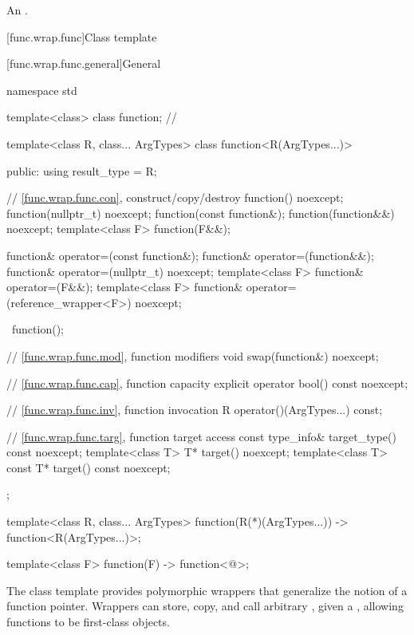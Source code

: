 \begin{itemdescr}
\pnum
\returns
An
 \ntbs{}.
\end{itemdescr}

[func.wrap.func]{Class template }

[func.wrap.func.general]{General}
%

%
\begin{codeblock}
namespace std {
  template<class> class function;       // \notdef

  template<class R, class... ArgTypes>
  class function<R(ArgTypes...)> {
  public:
    using result_type = R;

    // \ref{func.wrap.func.con}, construct/copy/destroy
    function() noexcept;
    function(nullptr_t) noexcept;
    function(const function&);
    function(function&&) noexcept;
    template<class F> function(F&&);

    function& operator=(const function&);
    function& operator=(function&&);
    function& operator=(nullptr_t) noexcept;
    template<class F> function& operator=(F&&);
    template<class F> function& operator=(reference_wrapper<F>) noexcept;

    ~function();

    // \ref{func.wrap.func.mod}, function modifiers
    void swap(function&) noexcept;

    // \ref{func.wrap.func.cap}, function capacity
    explicit operator bool() const noexcept;

    // \ref{func.wrap.func.inv}, function invocation
    R operator()(ArgTypes...) const;

    // \ref{func.wrap.func.targ}, function target access
    const type_info& target_type() const noexcept;
    template<class T>       T* target() noexcept;
    template<class T> const T* target() const noexcept;
  };

  template<class R, class... ArgTypes>
    function(R(*)(ArgTypes...)) -> function<R(ArgTypes...)>;

  template<class F> function(F) -> function<@\seebelow@>;
}
\end{codeblock}

\pnum
The  class template provides polymorphic wrappers that
generalize the notion of a function pointer. Wrappers can store, copy,
and call arbitrary , given a
, allowing functions to be first-class objects.

